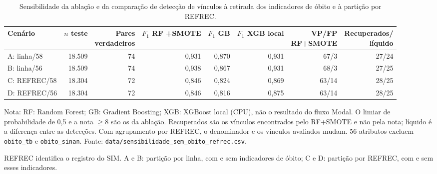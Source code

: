 \begin{table}[htbp]
\centering\footnotesize
\setlength{\tabcolsep}{3pt}
\caption{Sensibilidade da ablação e da comparação de detecção de vínculos à retirada dos indicadores de óbito e à partição por REFREC.}
\label{tab:sensibilidade-2x2}
\begin{tabular}{lrrrrrrr}
\toprule
Cenário & $n$ teste & \shortstack{Pares\\verdadeiros} & \shortstack{$F_1$ RF\\+SMOTE} & $F_1$ GB & \shortstack{$F_1$ XGB\\local} & \shortstack{VP/FP\\RF+SMOTE} & \shortstack{Recuperados/\\líquido} \\
\midrule
A: linha/58 & 18.509 & 74 & 0,931 & 0,870 & 0,931 & 67/3 & 27/24 \\
B: linha/56 & 18.509 & 74 & 0,938 & 0,867 & 0,931 & 68/3 & 27/25 \\
C: REFREC/58 & 18.304 & 72 & 0,846 & 0,824 & 0,869 & 63/14 & 28/25 \\
D: REFREC/56 & 18.304 & 72 & 0,846 & 0,816 & 0,875 & 63/14 & 28/25 \\
\bottomrule
\end{tabular}
\par\smallskip\begin{minipage}{\textwidth}\footnotesize
Nota: RF: Random Forest; GB: Gradient Boosting; XGB: XGBoost local (CPU), não o resultado do fluxo Modal. O limiar de probabilidade de 0,5 e a nota $\geq 8$ são os da ablação. Recuperados são os vínculos encontrados pelo RF+SMOTE e não pela nota; líquido é a diferença entre as detecções. Com agrupamento por REFREC, o denominador e os vínculos avaliados mudam. 56 atributos excluem \texttt{obito\_tb} e \texttt{obito\_sinan}. Fonte: \texttt{data/sensibilidade\_sem\_obito\_refrec.csv}.
\end{minipage}
\par\footnotesize REFREC identifica o registro do SIM. A e B: partição por linha, com e sem indicadores de óbito; C e D: partição por REFREC, com e sem esses indicadores.
\end{table}
